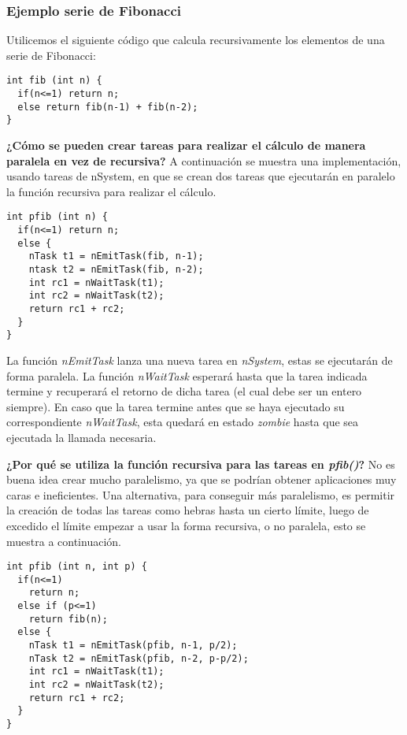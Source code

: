 \subsubsection{Ejemplo serie de Fibonacci}

Utilicemos el siguiente código que calcula recursivamente los elementos de una serie de Fibonacci:

\begin{verbatim}
int fib (int n) {
  if(n<=1) return n;
  else return fib(n-1) + fib(n-2);
}
\end{verbatim}

\textbf{¿Cómo se pueden crear tareas para realizar el cálculo de manera paralela en vez de recursiva?} A continuación se muestra una implementación, usando tareas de nSystem, en que se crean dos tareas que ejecutarán en paralelo la función recursiva para realizar el cálculo.

\begin{verbatim}
int pfib (int n) {
  if(n<=1) return n;
  else {
    nTask t1 = nEmitTask(fib, n-1);
    ntask t2 = nEmitTask(fib, n-2);
    int rc1 = nWaitTask(t1);
    int rc2 = nWaitTask(t2);
    return rc1 + rc2;
  }
}
\end{verbatim}

La función \emph{nEmitTask} lanza una nueva tarea en \emph{nSystem}, estas se ejecutarán de forma paralela. La función \emph{nWaitTask} esperará hasta que la tarea indicada termine y recuperará el retorno de dicha tarea (el cual debe ser un entero siempre). En caso que la tarea termine antes que se haya ejecutado su correspondiente \emph{nWaitTask}, esta quedará en estado \emph{zombie} hasta que sea ejecutada la llamada necesaria.

\textbf{¿Por qué se utiliza la función recursiva para las tareas en \emph{pfib()}?} No es buena idea crear mucho paralelismo, ya que se podrían obtener aplicaciones muy caras e ineficientes. Una alternativa, para conseguir más paralelismo, es permitir la creación de todas las tareas como hebras hasta un cierto límite, luego de excedido el límite empezar a usar la forma recursiva, o no paralela, esto se muestra a continuación.

\begin{verbatim}
int pfib (int n, int p) {
  if(n<=1)
    return n;
  else if (p<=1)
    return fib(n);
  else {
    nTask t1 = nEmitTask(pfib, n-1, p/2);
    nTask t2 = nEmitTask(pfib, n-2, p-p/2);
    int rc1 = nWaitTask(t1);
    int rc2 = nWaitTask(t2);
    return rc1 + rc2;
  }
}
\end{verbatim}

